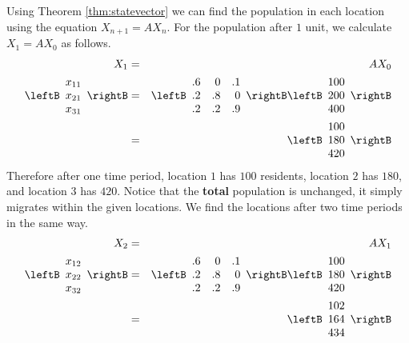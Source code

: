 \begin{solution}
Using Theorem \ref{thm:statevector} we can find the population in each location using the equation $X_{n+1} = AX_n$. For the population after $1$ unit, we calculate $X_1 = AX_0$ as follows.
\begin{eqnarray*}
X_1 &=& AX_0 \\
\leftB \begin{array}{r}
x_{11} \\
x_{21} \\
x_{31}
\end{array}\rightB 
&=& 
\leftB
\begin{array}{rrr}
.6 & 0 & .1 \\
.2 & .8 & 0 \\
.2 & .2 & .9
\end{array}
\rightB 
\leftB
\begin{array}{r}
100 \\
200 \\
400
\end{array}
\rightB \\
&=& 
\leftB
\begin{array}{r}
100 \\
180 \\
420
\end{array}\rightB
\end{eqnarray*}
Therefore after one time period, location $1$ has $100$ residents, location $2$ has $180$, and location $3$ has $420$. Notice that the \textbf{total} population is unchanged, it simply migrates within the given locations.
We find the locations after two time periods in the same way. 
\begin{eqnarray*}
X_2 &=& AX_1 \\
\leftB \begin{array}{r}
x_{12} \\
x_{22} \\
x_{32}
\end{array}\rightB 
&=& 
\leftB
\begin{array}{rrr}
.6 & 0 & .1 \\
.2 & .8 & 0 \\
.2 & .2 & .9
\end{array}
\rightB 
\leftB
\begin{array}{r}
100 \\
180 \\
420
\end{array}
\rightB \\
&=& 
\leftB
\begin{array}{r}
102 \\
164 \\
434
\end{array}\rightB
\end{eqnarray*}


\end{solution}
